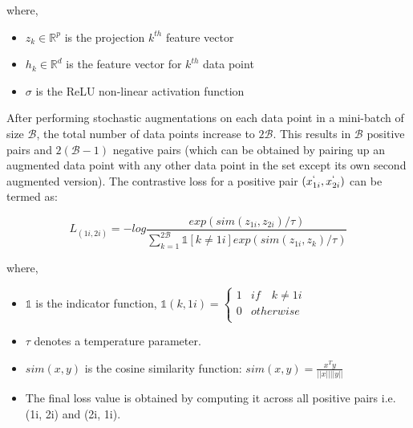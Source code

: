 where,
\begin{itemize}[label={}]
  \setlength\itemsep{0em}
  \item $z_k \in \mathbb{R}^{p}$ is the projection $k^{th}$ feature vector
  \item $h_k \in \mathbb{R}^{d}$ is the feature vector for $k^{th}$ data point
  \item $\sigma$ is the ReLU\cite{nwankpa2018} non-linear activation function
\end{itemize}
After performing stochastic augmentations on each data point in a mini-batch of size $\mathcal{B}$, the total number of data points increase to $2\mathcal{B}$. This results in $\mathcal{B}$ positive pairs and $2(\mathcal{B}-1)$ negative pairs (which can be obtained by pairing up an augmented data point with any other data point in the set except its own second augmented version). The contrastive loss for a positive pair $(x_{1i}^{`}, x_{2i}^{`})$ can be termed as:

\begin{equation}
    \label{equation:simclr_contrastive_loss}
    L_{(1i, 2i)} = -log \frac{exp(sim(z_{1i}, z_{2i}) / \tau)}{\sum_{k=1}^{2\mathcal{B}} \mathbb{1}[k\neq 1i] exp(sim(z_{1i}, z_{k}) / \tau)}
\end{equation}

where,
\begin{itemize}[label={}]
  \setlength\itemsep{0em}
  \item $\mathbb{1}$ is the indicator function, $\mathbb{1}(k, 1i) = \begin{cases} 
      1 & if \quad k \neq 1i \\
      0 & otherwise \\
   \end{cases}$ 
   \item $\tau$ denotes a temperature parameter. 
   \item $sim(x, y)$ is the cosine similarity function: $sim(x, y) = \frac{x^{T}y}{||x||||y||}$
   \item The final loss value is obtained by computing it across all positive pairs i.e. (1i, 2i) and (2i, 1i).
\end{itemize}

